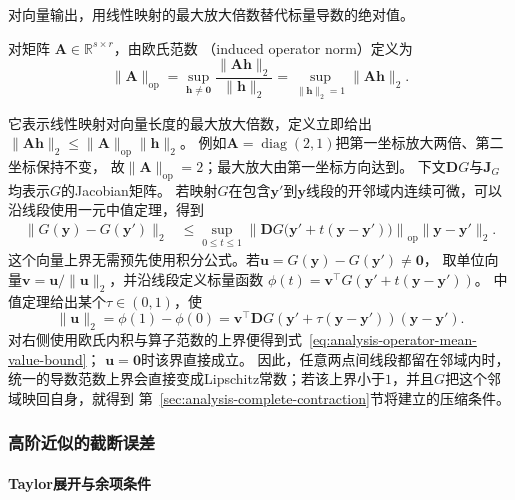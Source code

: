 对向量输出，用线性映射的最大放大倍数替代标量导数的绝对值。
\begin{definition}[欧氏诱导算子范数]
\label{def:analysis-induced-operator-norm}
对矩阵
$\bm{A}\in\mathbb{R}^{s\times r}$，由欧氏范数
（induced operator norm）定义为
\[
  \lVert\bm{A}\rVert_{\mathrm{op}}
  =
  \sup_{\bm{h}\neq\bm{0}}
  \frac{\lVert\bm{A}\bm{h}\rVert_2}{\lVert\bm{h}\rVert_2}
  =
  \sup_{\lVert\bm{h}\rVert_2=1}\lVert\bm{A}\bm{h}\rVert_2.
\]
\end{definition}
它表示线性映射对向量长度的最大放大倍数，定义立即给出
$\lVert\bm{A}\bm{h}\rVert_2
\leq\lVert\bm{A}\rVert_{\mathrm{op}}\lVert\bm{h}\rVert_2$。
例如$\bm A=\operatorname{diag}(2,1)$把第一坐标放大两倍、第二坐标保持不变，
故$\lVert\bm A\rVert_{\mathrm{op}}=2$；最大放大由第一坐标方向达到。
下文$\bm DG$与$\bm J_G$均表示$G$的Jacobian矩阵。
若映射$G$在包含$\bm{y}'$到$\bm{y}$线段的开邻域内连续可微，可以沿线段使用一元中值定理，得到
\begin{equation}
  \begin{aligned}
  \lVert G(\bm{y})-G(\bm{y}')\rVert_2
  &\leq
  \sup_{0\leq t\leq1}
  \left\lVert
    \bm{D}G\bigl(\bm{y}'+t(\bm{y}-\bm{y}')\bigr)
  \right\rVert_{\mathrm{op}}
  \lVert\bm{y}-\bm{y}'\rVert_2.
  \end{aligned}
\label{eq:analysis-operator-mean-value-bound}
\end{equation}
这个向量上界无需预先使用积分公式。若$\bm u=G(\bm y)-G(\bm y')\neq\bm0$，
取单位向量$\bm v=\bm u/\lVert\bm u\rVert_2$，并沿线段定义标量函数
$\phi(t)=\bm v^\top G(\bm y'+t(\bm y-\bm y'))$。
中值定理给出某个$\tau\in(0,1)$，使
\[
 \lVert\bm u\rVert_2
 =\phi(1)-\phi(0)
 =\bm v^\top\bm DG(\bm y'+\tau(\bm y-\bm y'))(\bm y-\bm y').
\]
对右侧使用欧氏内积与算子范数的上界便得到式~\eqref{eq:analysis-operator-mean-value-bound}；
$\bm u=\bm0$时该界直接成立。
因此，任意两点间线段都留在邻域内时，统一的导数范数上界会直接变成Lipschitz常数；若该上界小于$1$，并且$G$把这个邻域映回自身，就得到
第~\ref{sec:analysis-complete-contraction}节将建立的压缩条件。

\subsubsection{高阶近似的截断误差}
\label{sec:analysis-taylor-approximation}

\paragraph{Taylor展开与余项条件}

